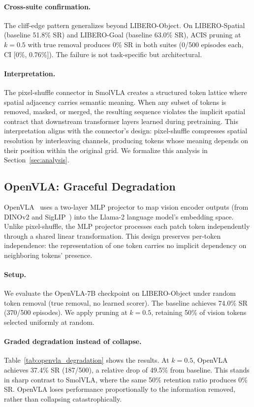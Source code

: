 \paragraph{Cross-suite confirmation.}
The cliff-edge pattern generalizes beyond LIBERO-Object. On LIBERO-Spatial (baseline 51.8\% SR) and LIBERO-Goal (baseline 63.0\% SR), ACIS pruning at $k{=}0.5$ with true removal produces 0\% SR in both suites (0/500 episodes each, CI [0\%, 0.76\%]). The failure is not task-specific but architectural.

\paragraph{Interpretation.}
The pixel-shuffle connector in SmolVLA creates a structured token lattice where spatial adjacency carries semantic meaning. When any subset of tokens is removed, masked, or merged, the resulting sequence violates the implicit spatial contract that downstream transformer layers learned during pretraining. This interpretation aligns with the connector's design: pixel-shuffle compresses spatial resolution by interleaving channels, producing tokens whose meaning depends on their position within the original grid. We formalize this analysis in Section~\ref{sec:analysis}.


\subsection{OpenVLA: Graceful Degradation}
\label{sec:openvla_results}

OpenVLA~\cite{kim2024openvla} uses a two-layer MLP projector to map vision encoder outputs (from DINOv2 and SigLIP~\cite{zhai2023siglip}) into the Llama-2 language model's embedding space. Unlike pixel-shuffle, the MLP projector processes each patch token independently through a shared linear transformation. This design preserves per-token independence: the representation of one token carries no implicit dependency on neighboring tokens' presence.

\paragraph{Setup.}
We evaluate the OpenVLA-7B checkpoint on LIBERO-Object under random token removal (true removal, no learned scorer). The baseline achieves 74.0\% SR (370/500 episodes). We apply pruning at $k{=}0.5$, retaining 50\% of vision tokens selected uniformly at random.

\paragraph{Graded degradation instead of collapse.}
Table~\ref{tab:openvla_degradation} shows the results. At $k{=}0.5$, OpenVLA achieves 37.4\% SR (187/500), a relative drop of 49.5\% from baseline. This stands in sharp contrast to SmolVLA, where the same 50\% retention ratio produces 0\% SR. OpenVLA loses performance proportionally to the information removed, rather than collapsing catastrophically.

